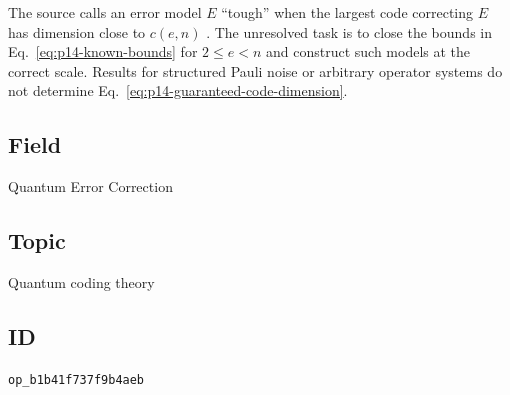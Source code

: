 The source calls an error model $E$ ``tough'' when the largest code correcting
$E$ has dimension close to $c(e,n)$
.  The unresolved task is to close
the bounds in Eq.~\eqref{eq:p14-known-bounds} for $2\le e<n$ and construct
such models at the correct scale.  Results for structured Pauli noise or
arbitrary operator systems do not determine
Eq.~\eqref{eq:p14-guaranteed-code-dimension}.

\subsection*{Field}

Quantum Error Correction

\subsection*{Topic}

Quantum coding theory

\subsection*{ID}

\texttt{op\_b1b41f737f9b4aeb}
